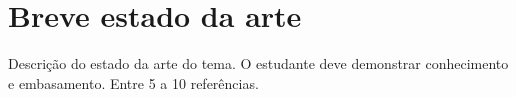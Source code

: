 \chapter{Breve estado da arte}

Descrição do estado da arte do tema. O estudante deve demonstrar conhecimento e embasamento. Entre 5 a 10 referências.
